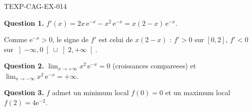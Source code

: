 \begin{corrige}{TEXP-CAG-EX-014}

\textbf{Question 1.} $f'(x) = 2x\,\mathrm{e}^{-x} - x^2\,\mathrm{e}^{-x} = x(2-x)\,\mathrm{e}^{-x}$.


Comme $\mathrm{e}^{-x} > 0$, le signe de $f'$ est celui de $x(2-x)$ :
$f' > 0$ sur $[0,2]$, $f' < 0$ sur $\left]-\infty,0\right[ \cup \left]2,+\infty\right[$.

\textbf{Question 2.} $\lim_{x \to +\infty} x^2\,\mathrm{e}^{-x} = 0$ (croissances compareees) et $\lim_{x \to -\infty} x^2\,\mathrm{e}^{-x} = +\infty$.

\textbf{Question 3.} $f$ admet un minimum local $f(0) = 0$ et un maximum local $f(2) = 4\mathrm{e}^{-2}$.

\end{corrige}
